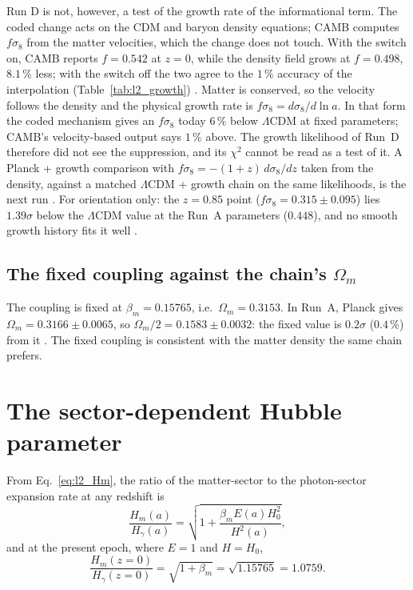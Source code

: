Run D is not, however, a test of the growth rate of the informational term. The coded change acts on the CDM and baryon density equations; CAMB
computes $f\sigma_8$ from the matter velocities, which the change does not touch. With the switch on, CAMB reports $f=0.542$ at $z=0$, while the
density field grows at $f=0.498$, $8.1\,\%$ less; with the switch off the two agree to the $1\,\%$ accuracy of the interpolation
(Table~\ref{tab:l2_growth}) \measured. Matter is conserved, so the velocity follows the density and the physical growth rate is
$f\sigma_8=d\sigma_8/d\ln a$. In that form the coded mechanism gives an $f\sigma_8$ today $6\,\%$ below $\Lambda$CDM at fixed parameters; CAMB's
velocity-based output says $1\,\%$ above. The growth likelihood of Run~D therefore did not see the suppression, and its $\chi^2$ cannot be read as a
test of it. A Planck + growth comparison with $f\sigma_8=-(1+z)\,d\sigma_8/dz$ taken from the density, against a matched $\Lambda$CDM + growth chain on
the same likelihoods, is the next run \openprob. For orientation only: the $z=0.85$ point ($f\sigma_8=0.315\pm0.095$) lies $1.39\sigma$ below the
$\Lambda$CDM value at the Run~A parameters ($0.448$), and no smooth growth history fits it well \calc.

\subsection{The fixed coupling against the chain's $\Omega_m$}
The coupling is fixed at $\beta_m=0.15765$, i.e.\ $\Omega_m=0.3153$. In Run~A, Planck gives $\Omega_m=0.3166\pm0.0065$, so
$\Omega_m/2=0.1583\pm0.0032$: the fixed value is $0.2\sigma$ ($0.4\,\%$) from it \measured. The fixed coupling is consistent with the matter density the
same chain prefers.

\section{The sector-dependent Hubble parameter}\label{sec:l2_hubble}
From Eq.~\eqref{eq:l2_Hm}, the ratio of the matter-sector to the photon-sector expansion rate at any redshift is
\begin{equation}
\frac{H_m(a)}{H_\gamma(a)}=\sqrt{1+\frac{\beta_mE(a)H_0^2}{H^2(a)}},
\label{eq:l2_ratio}\end{equation}
and at the present epoch, where $E=1$ and $H=H_0$,
\begin{equation}
\frac{H_m(z{=}0)}{H_\gamma(z{=}0)}=\sqrt{1+\beta_m}=\sqrt{1.15765}=1.0759 .
\label{eq:l2_ratio0}\end{equation}
\derived


